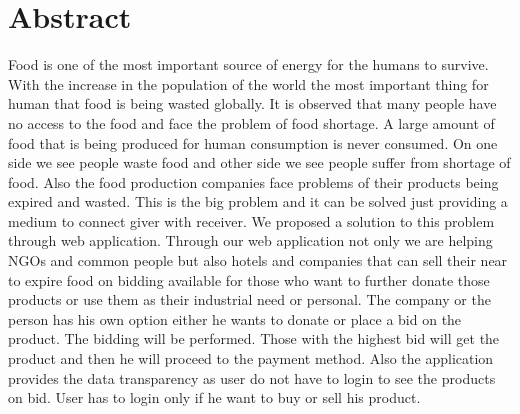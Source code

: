 \chapter*{Abstract}
\doublespacing
Food is one of the most important source of energy for the humans to survive. With the increase in the population of the world the most important thing for human that food is being wasted globally. It is observed that many people have no access to the food and face the problem of food shortage. A large amount of food that is being produced for human consumption is never consumed. On one side we see people waste food and other side we see people suffer from shortage of food. Also the food production companies face problems of their products being expired and wasted. This is the big problem and it can be solved just providing a medium to connect giver with receiver. We proposed a solution to this problem through web application. Through our web application not only we are helping NGOs and common people but also hotels and companies that can sell their near to expire food on bidding available for those who want to further donate those products or use them as their industrial need or personal. The company or the person has his own option either he wants to donate or place a bid on the product. The bidding will be performed. Those with the highest bid will get the product and then he will proceed to the payment method. Also the application provides the data transparency as user do not have to login to see the products on bid. User has to login only if he want to buy or sell his product.
